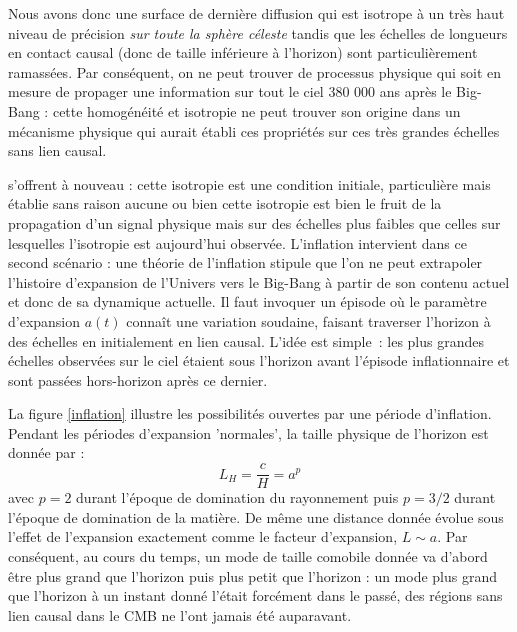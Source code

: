 Nous avons donc une surface de dernière diffusion qui est isotrope à un très haut niveau de précision \textit{sur toute la sphère céleste} tandis que les échelles de longueurs en contact causal (donc de taille inférieure à l'horizon) sont particulièrement ramassées. Par conséquent, on ne peut trouver de processus physique qui soit en mesure de propager une information sur tout le ciel 380 000 ans après le Big-Bang : cette homogénéité et isotropie ne peut trouver son origine dans un mécanisme physique qui aurait établi ces propriétés sur ces très grandes échelles sans lien causal.

 s'offrent à nouveau : cette isotropie est une condition initiale, particulière mais établie sans raison aucune ou bien cette isotropie est bien le fruit de la propagation d'un signal physique mais sur des échelles plus faibles que celles sur lesquelles l'isotropie est aujourd'hui observée. L'inflation intervient dans ce second scénario : une théorie de l'inflation stipule que l'on ne peut extrapoler l'histoire d'expansion de l'Univers vers le Big-Bang à partir de son contenu actuel et donc de sa dynamique actuelle. Il faut invoquer un épisode où le paramètre d'expansion $a(t)$ connaît une variation soudaine, faisant traverser l'horizon à des échelles en initialement en lien causal. L'idée est simple~: les plus grandes échelles observées sur le ciel étaient sous l'horizon avant l'épisode inflationnaire et sont passées hors-horizon après ce dernier. 

La figure \ref{inflation} illustre les possibilités ouvertes par une période d'inflation. Pendant les périodes d'expansion 'normales', la taille physique de l'horizon est donnée par :
\begin{equation}
L_H=\frac{c}{H}=a^p
\end{equation}
avec $p=2$ durant l'époque de domination du rayonnement puis $p=3/2$ durant l'époque de domination de la matière. De même une distance donnée évolue sous l'effet de l'expansion exactement comme le facteur d'expansion, $L\sim a$. Par conséquent, au cours du temps, un mode de taille comobile donnée va d'abord être plus grand que l'horizon puis plus petit que l'horizon : un mode plus grand que l'horizon à un instant donné l'était forcément dans le passé, des régions sans lien causal dans le CMB ne l'ont jamais été auparavant. 

